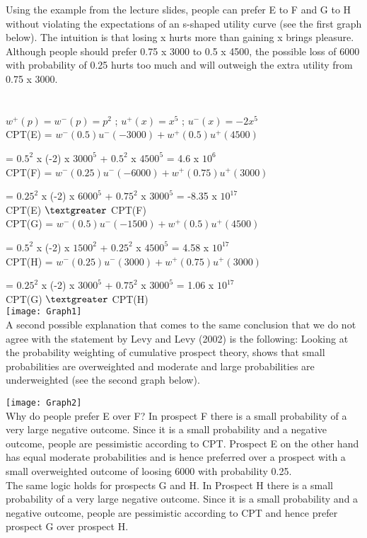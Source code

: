 \documentclass{article}
\begin{document}
Using the example from the lecture slides, people can prefer E to F and G to H without violating the expectations of an s-shaped utility curve (see the first graph below). The intuition is that losing x hurts more than gaining x brings pleasure. Although people should prefer 0.75 x 3000 to 0.5 x 4500, the possible loss of 6000 with probability of 0.25 hurts too much and will outweigh the extra utility from 0.75 x 3000.\\ \\ \\

$w^+(p)=w^-(p)=p^2$  ;  
$u^+(x)=x^5$  ;  
$u^-(x)=-2x^5$ \\


CPT(E) = $w^-(0.5)u^-(-3000)+w^+(0.5)u^+(4500)$ 

= $0.5^2$ x (-2) x $3000^5$ + $0.5^2$ x $4500^5$ = 4.6 x $10^6$  \\

CPT(F) = $w^-(0.25)u^-(-6000)+w^+(0.75)u^+(3000)$

= $0.25^2$ x (-2) x $6000^5$ + $0.75^2$ x $3000^5$ = -8.35 x $10^{17}$ \\

CPT(E) $\textgreater$ CPT(F) \\

CPT(G) = $w^-(0.5)u^-(-1500)+w^+(0.5)u^+(4500)$

= $0.5^2$ x (-2) x $1500^2$ + $0.25^2$ x $4500^5$ = 4.58 x $10^{17}$ \\

CPT(H) = $w^-(0.25)u^-(3000)+w^+(0.75)u^+(3000)$

= $0.25^2$ x (-2) x $3000^5$ + $0.75^2$ x $3000^5$ = 1.06 x $10^{17}$ \\

CPT(G) $\textgreater$ CPT(H) \\



\texttt{[image: Graph1]} \\

A second possible explanation that comes to the same conclusion that we do not agree with
the statement by Levy and Levy (2002) is the following:
Looking at the probability weighting of cumulative prospect theory, shows that small
probabilities are overweighted and moderate and large probabilities are underweighted (see the second graph below). 

\texttt{[image: Graph2]} \\

Why do people prefer E over F? In prospect F there is a small probability of a very large
negative outcome. Since it is a small probability and a negative outcome, people are
pessimistic according to CPT. Prospect E on the other hand has equal moderate probabilities
and is hence preferred over a prospect with a small overweighted outcome of loosing 6000
with probability 0.25. \\

The same logic holds for prospects G and H. In Prospect H there is a small probability of a
very large negative outcome. Since it is a small probability and a negative outcome, people
are pessimistic according to CPT and hence prefer prospect G over prospect H.
\end{document}
